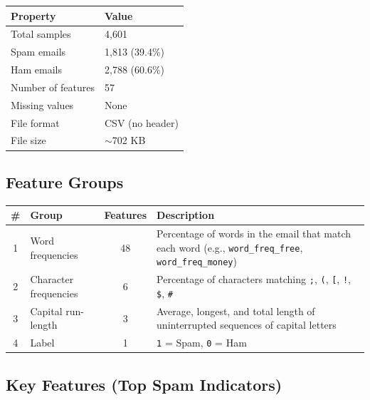\documentclass[12pt, a4paper]{article}
\begin{document}
\begin{table}[h]
\centering
\begin{tabular}{|l|l|}
\hline
\textbf{Property} & \textbf{Value} \\ \hline
Total samples & 4,601 \\ \hline
Spam emails & 1,813 (39.4\%) \\ \hline
Ham emails & 2,788 (60.6\%) \\ \hline
Number of features & 57 \\ \hline
Missing values & None \\ \hline
File format & CSV (no header) \\ \hline
File size & $\sim$702 KB \\ \hline
\end{tabular}
\end{table}

\subsection{Feature Groups}

\begin{table}[h]
\centering
\begin{tabular}{|c|l|c|p{8cm}|}
\hline
\textbf{\#} & \textbf{Group} & \textbf{Features} & \textbf{Description} \\ \hline
1 & Word frequencies & 48 & Percentage of words in the email that match each word (e.g., \texttt{word\_freq\_free}, \texttt{word\_freq\_money}) \\ \hline
2 & Character frequencies & 6 & Percentage of characters matching \texttt{;}, \texttt{(}, \texttt{[}, \texttt{!}, \texttt{\$}, \texttt{\#} \\ \hline
3 & Capital run-length & 3 & Average, longest, and total length of uninterrupted sequences of capital letters \\ \hline
4 & Label & 1 & \texttt{1} = Spam, \texttt{0} = Ham \\ \hline
\end{tabular}
\end{table}

\subsection{Key Features (Top Spam Indicators)}
\end{document}
